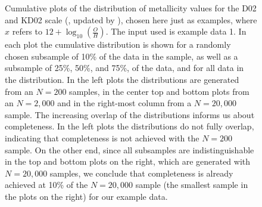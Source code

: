 \documentclass{emulateapj}
\newcommand{\oxab}{\ensuremath{12 + \log_{10}(\frac{O}{H})}}
\begin{document}
\begin{figure}[!ht]
\caption{Cumulative plots of the distribution of metallicity values for the D02 \citep{denicolo02} and KD02 scale (\citealt{kewley02}, updated by \citealt{kewley08}), chosen here just as examples, where $x$ refers to \oxab. The input used is example data 1. In each plot the cumulative distribution is shown for a randomly chosen subsample of 10\% of the data in the sample, as well as a subsample of 25\%, 50\%, and 75\%, of the data, and for all data in the distribution. In the left plots the distributions are generated from an $N=200$ samples, in the center top and bottom plots from an $N=2,000$  and in the right-most column from a $N=20,000$ sample. The increasing overlap of the distributions informs us about completeness. In the left plots the distributions do not fully overlap, indicating that completeness is not achieved with the $N=200$ sample. On the other end, since all subsamples are indistinguishable in the top and bottom plots on the right, which are generated with $N=20,000$ samples, we conclude that completeness is already achieved at 10\% of the $N=20,000$ sample (the smallest sample in the plots on the right) for our example data.}
 \label{cd}
\end{figure}
\end{document}
